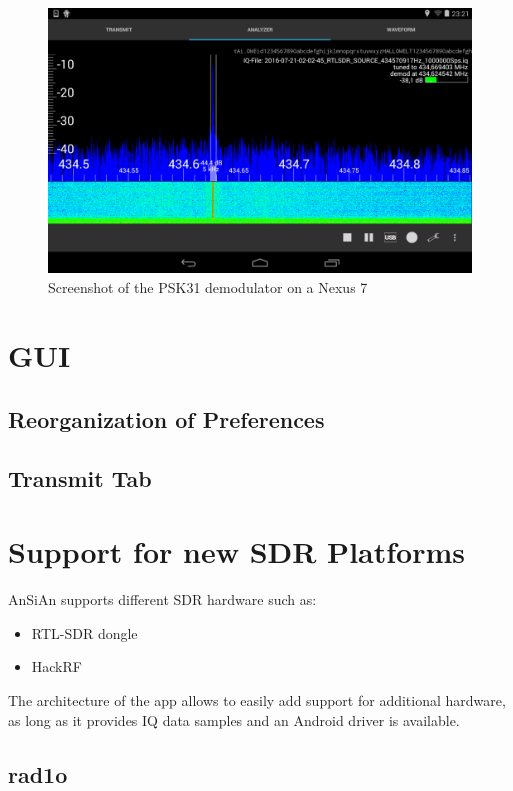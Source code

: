 \begin{figure}
	\centering
	\includegraphics[width=1\linewidth]{gfx/psk31/psk31_android_screenshot.png}
	\caption{Screenshot of the PSK31 demodulator on a Nexus 7}
	\label{fig:psk31_android_screenshot}
\end{figure}


\section{GUI}
\subsection{Reorganization of Preferences}
\subsection{Transmit Tab}

\section{Support for new SDR Platforms}

\ac{AnSiAn} supports different \ac{SDR} hardware such as:
\begin{itemize}
	\item RTL-SDR dongle
	\item HackRF
\end{itemize}

The architecture of the app allows to easily add support for additional hardware,
as long as it provides IQ data samples and an Android driver is available.

\subsection{rad1o}

